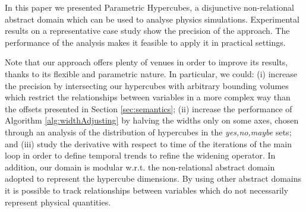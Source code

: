 In this paper we presented Parametric Hypercubes, a disjunctive non-relational abstract domain which can be used to analyse physics simulations. Experimental results on a representative case study show the precision of the approach. The performance of the analysis makes it feasible to apply it in practical settings. 

Note that our approach offers plenty of venues in order to improve its results, thanks to its flexible and parametric nature. In particular, we could: (i) increase the precision by intersecting our hypercubes with arbitrary bounding volumes which restrict the relationships between variables in a more complex way than the offsets presented in Section \ref{sec:semantics}; (ii) increase the performance of Algorithm \ref{alg:widthAdjusting} by halving the widths only on some axes, chosen through an analysis of the distribution of hypercubes in the \emph{yes,no,maybe} sets; and (iii) study the derivative with respect to time of the iterations of the main loop in order to define temporal trends to refine the widening operator.
In addition, our domain is modular w.r.t. the non-relational abstract domain adopted to represent the hypercube dimensions. By using other abstract domains it is possible to track relationships between variables which do not necessarily represent physical quantities.